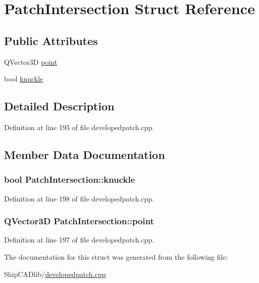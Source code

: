 \hypertarget{structPatchIntersection}{}\section{Patch\+Intersection Struct Reference}
\label{structPatchIntersection}
\subsection*{Public Attributes}
\begin{DoxyCompactItemize}
\item 
Q\+Vector3D \hyperlink{structPatchIntersection_ada1d0adcd4dbc07d37a1676ac3c89cf0}{point}
\item 
bool \hyperlink{structPatchIntersection_a328e33e74b1d1904db5d69fd512b7d5c}{knuckle}
\end{DoxyCompactItemize}


\subsection{Detailed Description}


Definition at line 195 of file developedpatch.\+cpp.



\subsection{Member Data Documentation}
\subsubsection[{\texorpdfstring{knuckle}{knuckle}}]{\setlength{\rightskip}{0pt plus 5cm}bool Patch\+Intersection\+::knuckle}\hypertarget{structPatchIntersection_a328e33e74b1d1904db5d69fd512b7d5c}{}\label{structPatchIntersection_a328e33e74b1d1904db5d69fd512b7d5c}


Definition at line 198 of file developedpatch.\+cpp.

\subsubsection[{\texorpdfstring{point}{point}}]{\setlength{\rightskip}{0pt plus 5cm}Q\+Vector3D Patch\+Intersection\+::point}\hypertarget{structPatchIntersection_ada1d0adcd4dbc07d37a1676ac3c89cf0}{}\label{structPatchIntersection_ada1d0adcd4dbc07d37a1676ac3c89cf0}


Definition at line 197 of file developedpatch.\+cpp.



The documentation for this struct was generated from the following file\+:\begin{DoxyCompactItemize}
\item 
Ship\+C\+A\+Dlib/\hyperlink{developedpatch_8cpp}{developedpatch.\+cpp}\end{DoxyCompactItemize}

